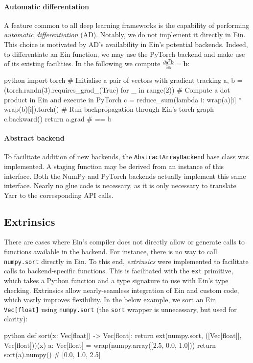 \paragraph{Automatic differentation} A feature common to all deep learning frameworks is the capability of performing \textit{automatic differentiation} (AD). Notably, we do not implement it directly in Ein. This choice is motivated by AD's availability in Ein's potential backends. Indeed, to differentiate an Ein function, we may use the PyTorch backend and make use of its existing facilities. In the following we compute $\frac{\partial \mathbf{a}^T \mathbf{b}}{\partial \mathbf{a}} = \mathbf{b}$:
\begin{center}
\begin{cminted}{python}
import torch
# Initialise a pair of vectors with gradient tracking
a, b = (torch.randn(3).requires_grad_(True) for _ in range(2))
# Compute a dot product in Ein and execute in PyTorch
c = reduce_sum(lambda i: wrap(a)[i] * wrap(b)[i]).torch()
# Run backpropagation through Ein's torch graph
c.backward()
return a.grad  # == b
\end{cminted}
\end{center}

\paragraph{Abstract backend} To facilitate addition of new backends, the \texttt{AbstractArrayBackend} base class was implemented. A staging function may be derived from an instance of this interface. Both the NumPy and PyTorch backends actually implement this same interface. Nearly no glue code is necessary, as it is only necessary to translate Yarr to the corresponding API calls.

\subsection{Extrinsics}

There are cases where Ein's compiler does not directly allow or generate calls to functions available in the backend. For instance, there is no way to call \texttt{numpy.sort} directly in Ein. To this end, \textit{extrinsics} were implemented to facilitate calls to backend-specific functions. This is facilitated with the \texttt{ext} primitive, which takes a Python function and a type signature to use with Ein's type checking. Extrinsics allow nearly-seamless integration of Ein and custom code, which vastly improves flexibility. In the below example, we sort an Ein \texttt{Vec[float]} using \texttt{numpy.sort} (the \texttt{sort} wrapper is unnecessary, but used for clarity):
\begin{center}
\begin{cminted}{python}    
def sort(x: Vec[float]) -> Vec[float]:
    return ext(numpy.sort, ([Vec[float]], Vec[float]))(x)
a: Vec[float] = wrap(numpy.array([2.5, 0.0, 1.0]))
return sort(a).numpy()  # [0.0, 1.0, 2.5]
\end{cminted}
\end{center}

